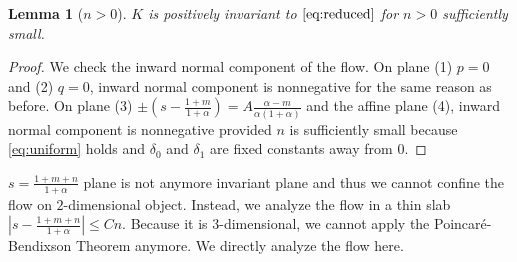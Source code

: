 \documentclass[a4paper,11pt]{article}
\newtheorem{lemma}{Lemma}[section]
\begin{document}
\begin{lemma}[$n>0$]
$K$ is positively invariant to $\eqref{eq:reduced}$ for $n>0$ sufficiently small.
\end{lemma}
\begin{proof}
We check the inward normal component of the flow.
 On plane (1) $p=0$ and (2) $q=0$, inward normal component is nonnegative for the same reason as before. On plane (3) $\pm\left(s-\frac{1+m}{1+\alpha}\right) = A \frac{\alpha-m}{\alpha(1+\alpha)}$ and the affine plane (4), inward normal component is nonnegative provided $n$ is sufficiently small because \eqref{eq:uniform} holds and $\delta_0$ and $\delta_1$ are fixed constants away from $0$.
\end{proof}
 $s = \frac{1+m+n}{1+\alpha}$ plane is not anymore invariant plane and thus we cannot confine the flow on $2$-dimensional object. Instead, we analyze the flow in a thin slab $|s - \frac{1+m+n}{1+\alpha}| \le Cn$. Because it is $3$-dimensional, we cannot apply the Poincar\'e-Bendixson Theorem anymore. We directly analyze the flow here.
\end{document}
